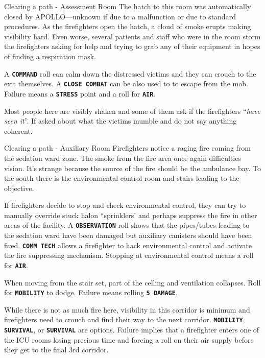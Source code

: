 \begin{rpg-commentbox}{Clearing a path - Assessment Room}
    The hatch to this room was automatically closed by APOLLO---unknown if due to a malfunction or due to standard procedures. As the firefighters open the hatch, a cloud of smoke erupts making visibility hard. Even worse, several patients and staff who were in the room storm the firefighters asking for help and trying to grab any of their equipment in hopes of finding a respiration mask. 

    A \texttt{\textbf{COMMAND}} roll can calm down the distressed victims and they can crouch to the exit themselves. A \texttt{\textbf{CLOSE COMBAT}} can be also used to to escape from the mob. 
    Failure means a \texttt{\textbf{STRESS}} point and a roll for \texttt{\textbf{AIR}}.

    Most people here are visibly shaken and some of them ask if the firefighters ``\textit{have seen it}''. If asked about what the victims mumble and do not say anything coherent. 
\end{rpg-commentbox}  



\begin{rpg-commentbox}{Clearing a path - Auxiliary Room}
    Firefighters notice a raging fire coming from the sedation ward zone. The smoke from the fire area once again difficulties vision. 
    It's strange because the source of the fire should be the ambulance bay. To the south there is the environmental control room and stairs leading to the objective. 
    
    If firefighters decide to stop and check environmental control, they can try to manually override stuck halon ``sprinklers' and perhaps suppress the fire in other areas of the facility. 
    A \texttt{\textbf{OBSERVATION}} roll shows that the pipes/tubes leading to the sedation ward have been damaged but auxiliary canisters should have been fired.
    \texttt{\textbf{COMM TECH}} allows a firefighter to hack environmental control and activate the fire suppressing mechanism. 
    Stopping at environmental control means a roll for \texttt{\textbf{AIR}}.


    When moving from the stair set, part of the celling and ventilation collapses. 
    Roll for \texttt{\textbf{MOBILITY}} to dodge. Failure means rolling 
    \texttt{\textbf{5 DAMAGE}}.
    
    While there is not as much fire here, visibility in this corridor is minimum and firefighters need to crouch and find their way to the next corridor. 
    \texttt{\textbf{MOBILITY}}, \texttt{\textbf{SURVIVAL}}, or \texttt{\textbf{SURVIVAL}} are options. Failure implies that a firefighter enters one of the ICU rooms losing precious time and forcing a roll on their air supply before they get to the final 3rd corridor.  
\end{rpg-commentbox}  



